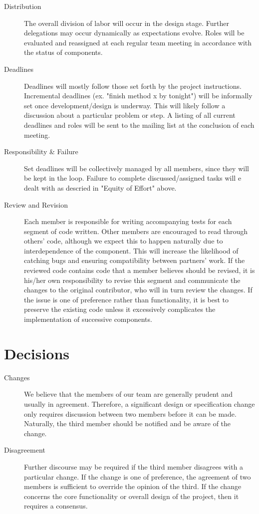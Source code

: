 \documentclass[twoside]{article}
\begin{document}
\begin{multicols}{2}
\begin{description}
	\item[Distribution] The overall division of labor will occur in the design stage. Further delegations may occur dynamically as expectations evolve. Roles will be evaluated and reassigned at each regular team meeting in accordance with the status of components.
	\item[Deadlines] Deadlines will mostly follow those set forth by the project instructions. Incremental deadlines (ex. "finish method x by tonight") will be informally set once development/design is underway. This will likely follow a discussion about a particular problem or step. A listing of all current deadlines and roles will be sent to the mailing list at the conclusion of each meeting.
	\item[Responsibility \& Failure] Set deadlines will be collectively managed by all members, since they will be kept in the loop. Failure to complete discussed/assigned tasks will e dealt with as descried in "Equity of Effort" above.
	\item[Review and Revision] Each member is responsible for writing accompanying tests for each segment of code written. Other members are encouraged to read through others' code, although we expect this to happen naturally due to interdependence of the component. This will increase the likelihood of catching bugs and ensuring compatibility between partners' work. If the reviewed code contains code that a member believes should be revised, it is his/her own responsibility to revise this segment and communicate the changes to the original contributor, who will in turn review the changes. If the issue is one of preference rather than functionality, it is best to preserve the existing code unless it excessively complicates the implementation of successive components.
\end{description}


\section{Decisions}

\begin{description}
	\item[Changes] We believe that the members of our team are generally prudent and usually in agreement. Therefore, a significant design or specification change only requires discussion between two members before it can be made. Naturally, the third member should be notified and be aware of the change.
	\item[Disagreement] Further discourse may be required if the third member disagrees with a particular change. If the change is one of preference, the agreement of two members is sufficient to override the opinion of the third. If the change concerns the core functionality or overall design of the project, then it requires a consensus.
\end{description}

\end{multicols}
\end{document}

